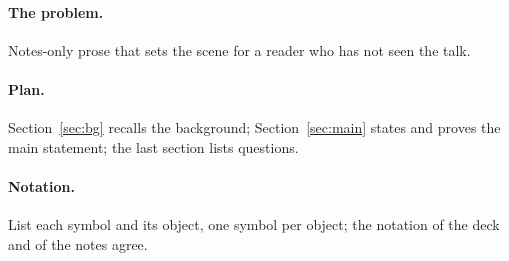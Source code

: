 \paragraph{The problem.} Notes-only prose that sets the scene for a reader who has not seen the talk.
\paragraph{Plan.} Section~\ref{sec:bg} recalls the background; Section~\ref{sec:main} states and proves the main statement; the last section lists questions.
\paragraph{Notation.} List each symbol and its object, one symbol per object; the notation of the deck and of the notes agree.
